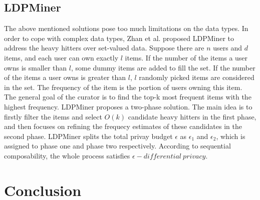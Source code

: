 \documentclass[a4paper, 11pt]{article} %
\begin{document}
\subsection{LDPMiner}
The above mentioned solutions pose too much limitations on the data types. In order to cope with complex data types, Zhan et al. proposed LDPMiner\cite{qin2016heavy} to address the heavy hitters over set-valued data. Suppose there are $n$ users and $d$ items, and each user can own exactly $l$ items. If the number of the items a user owns is smaller than $l$, some dummy items are added to fill the set. If the number of the items a user owns is greater than $l$, $l$ randomly picked items are considered in the set. The frequency of the item is the portion of users owning this item. The general goal of the curator is to find the top-k most frequent items with the highest frequency. LDPMiner proposes a two-phase solution. The main idea is to firstly filter the items and select $O(k)$ candidate heavy hitters in the first phase, and then focuses on refining the frequecy estimates of these candidates in the second phase. LDPMiner splits the total privay budget $\epsilon$ as $\epsilon_1$ and $\epsilon_2$, which is assigned to phase one and phase two respectively. According to sequential composability\cite{mcsherry2009privacy}, the whole process satisfies $\epsilon - differential \ privacy$.

\section*{Conclusion}










\end{document}
